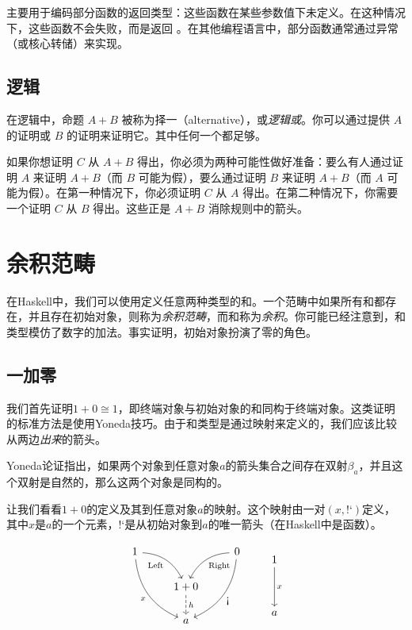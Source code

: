 \documentclass[DaoFP]{subfiles}
\begin{document}
 主要用于编码部分函数的返回类型：这些函数在某些参数值下未定义。在这种情况下，这些函数不会失败，而是返回 。在其他编程语言中，部分函数通常通过异常（或核心转储）来实现。

\subsection{逻辑}

在逻辑中，命题 $A + B$ 被称为择一（alternative），或\emph{逻辑或}。你可以通过提供 $A$ 的证明或 $B$ 的证明来证明它。其中任何一个都足够。

如果你想证明 $C$ 从 $A+B$ 得出，你必须为两种可能性做好准备：要么有人通过证明 $A$ 来证明 $A+B$（而 $B$ 可能为假），要么通过证明 $B$ 来证明 $A+B$（而 $A$ 可能为假）。在第一种情况下，你必须证明 $C$ 从 $A$ 得出。在第二种情况下，你需要一个证明 $C$ 从 $B$ 得出。这些正是 $A+B$ 消除规则中的箭头。

\section{余积范畴}

在Haskell中，我们可以使用定义任意两种类型的和。一个范畴中如果所有和都存在，并且存在初始对象，则称为\emph{余积范畴}，而和称为\emph{余积}。你可能已经注意到，和类型模仿了数字的加法。事实证明，初始对象扮演了零的角色。

\subsection{一加零}

我们首先证明$1 + 0 \cong 1$，即终端对象与初始对象的和同构于终端对象。这类证明的标准方法是使用Yoneda技巧。由于和类型是通过映射来定义的，我们应该比较从两边\emph{出来}的箭头。

Yoneda论证指出，如果两个对象到任意对象$a$的箭头集合之间存在双射$\beta_a$，并且这个双射是自然的，那么这两个对象是同构的。

让我们看看$1 + 0$的定义及其到任意对象$a$的映射。这个映射由一对$(x, \mbox{!`})$定义，其中$x$是$a$的一个元素，$\mbox{!`}$是从初始对象到$a$的唯一箭头（在Haskell中是函数）。

\[
 \begin{tikzcd}
 1
 \arrow[dr,  bend left, "\text{Left}"']
 \arrow[ddr, bend right, "x"']
 && 0
 \arrow[dl, bend right, "\text{Right}"]
 \arrow[ddl, bend left, "\mbox{!`}"]
 \\
&1 + 0
\arrow[d, dashed, "h"]
\\
& a
 \end{tikzcd}
 \qquad
 \begin{tikzcd}
 1
 \arrow[dd, "x"]
 \\
 \\
 a
 \end{tikzcd}
\]
\end{document}
